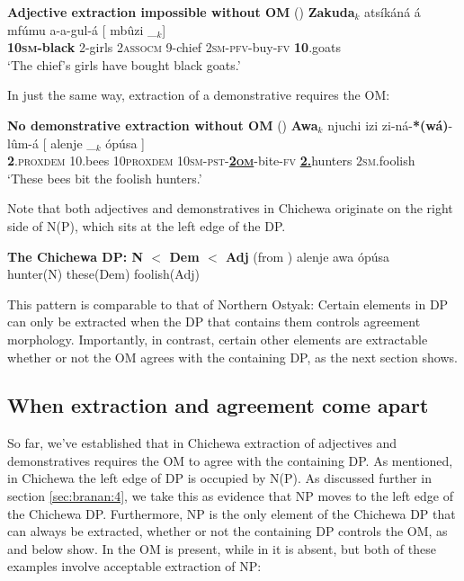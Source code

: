 \documentclass[output=paper,colorlinks,citecolor=brown]{langscibook}
\begin{document}
\ea%
    \label{ex:branan:6}
    \textbf{Adjective extraction impossible without OM}  \hfill{(\citealt[ex. 4a]{Mchombo2006})}
    \gll    *\textbf{Zakuda}$_{k}$ ats\'{i}k\'{a}n\'{a} \'{a} mf\'{u}mu a-a-gul-\'{a} [ mb\^{u}zi   \_$_{k}$]   \\
            \textbf{10\textsc{sm}-black} 2-girls 2\textsc{assocm} 9-chief 2\textsc{sm-pfv}-buy-\textsc{fv} {} \textbf{10}.goats {} \\
    \glt    `The chief's girls have bought black goats.'
\z

In just the same way, extraction of a demonstrative requires the OM:

\ea%
    \label{ex:branan:7}
    \textbf{No demonstrative extraction without OM} \hfill{(\citealt[ex. 2b-c]{Mchombo2006})}
    \gll    \textbf{Awa}$_{k}$ njuchi izi zi-n\'{a}-\textbf{*(w\'{a})}-l\^{u}m-\'{a} [ alenje \_$_{k}$ \'{o}p\'{u}sa  ] \\
            \textbf{2}.\textsc{proxdem} 10.bees 10\textsc{proxdem} 10\textsc{sm-pst}-\underline{\textbf{2\textsc{om}}}-bite-\textsc{fv} {} \underline{\textbf{2.}}hunters {} 2\textsc{sm}.foolish {} \\
    \glt    `These bees bit the foolish hunters.'
\z

Note that both adjectives and demonstratives in Chichewa originate on the right side of N(P), which sits at the left edge of the DP.

\ea%
    \label{ex:branan:8}
    \textbf{The Chichewa DP: N $<$ Dem $<$ Adj}  \hfill{(from \citealt[ex. 2a]{Mchombo2006})}
    \gll    alenje awa \'{o}p\'{u}sa \\
            hunter(N) these(Dem) foolish(Adj) \\
\z

This pattern is comparable to that of Northern Ostyak: Certain elements in DP can only be extracted when the DP that contains them controls agreement morphology. Importantly, in contrast, certain other elements are extractable whether or not the OM agrees with the containing DP, as the next section shows.

\subsection{When extraction and agreement come apart}\label{sec:branan:3.2}

So far, we've established that in Chichewa extraction of adjectives and demonstratives requires the OM to agree with the containing DP. As mentioned, in Chichewa the left edge of DP is occupied by N(P). As discussed further in section \ref{sec:branan:4}, we take this as evidence that NP moves to the left edge of the Chichewa DP. Furthermore, NP is the only element of the Chichewa DP that can always be extracted, whether or not the containing DP controls the OM, as  and  below show. In  the OM is present, while in  it is absent, but both of these examples involve acceptable extraction of NP:
\end{document}
